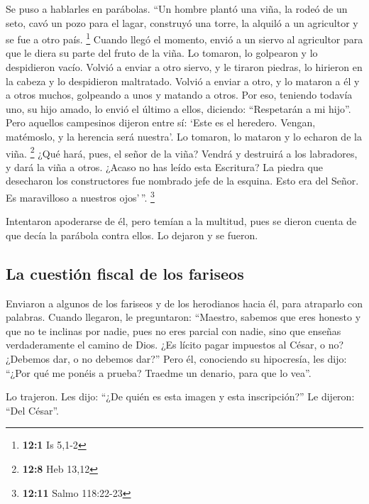  Se puso a hablarles en parábolas. ``Un hombre plantó una
viña, la rodeó de un seto, cavó un pozo para el lagar, construyó una
torre, la alquiló a un agricultor y se fue a otro país. \footnote{\textbf{12:1}
  Is 5,1-2}  Cuando llegó el momento, envió a un siervo al
agricultor para que le diera su parte del fruto de la viña.
 Lo tomaron, lo golpearon y lo despidieron vacío.
 Volvió a enviar a otro siervo, y le tiraron piedras, lo
hirieron en la cabeza y lo despidieron maltratado.  Volvió
a enviar a otro, y lo mataron a él y a otros muchos, golpeando a unos y
matando a otros.  Por eso, teniendo todavía uno, su hijo
amado, lo envió el último a ellos, diciendo: ``Respetarán a mi hijo''.
 Pero aquellos campesinos dijeron entre sí: `Este es el
heredero. Vengan, matémoslo, y la herencia será nuestra'. 
Lo tomaron, lo mataron y lo echaron de la viña. \footnote{\textbf{12:8}
  Heb 13,12}  ¿Qué hará, pues, el señor de la viña? Vendrá
y destruirá a los labradores, y dará la viña a otros. 
¿Acaso no has leído esta Escritura? La piedra que desecharon los
constructores fue nombrado jefe de la esquina.  Esto era
del Señor. Es maravilloso a nuestros ojos'\,''. \footnote{\textbf{12:11}
  Salmo 118:22-23}

 Intentaron apoderarse de él, pero temían a la multitud,
pues se dieron cuenta de que decía la parábola contra ellos. Lo dejaron
y se fueron.

\hypertarget{la-cuestiuxf3n-fiscal-de-los-fariseos}{%
\subsection{La cuestión fiscal de los
fariseos}\label{la-cuestiuxf3n-fiscal-de-los-fariseos}}

 Enviaron a algunos de los fariseos y de los herodianos
hacia él, para atraparlo con palabras.  Cuando llegaron,
le preguntaron: ``Maestro, sabemos que eres honesto y que no te inclinas
por nadie, pues no eres parcial con nadie, sino que enseñas
verdaderamente el camino de Dios. ¿Es lícito pagar impuestos al César, o
no?  ¿Debemos dar, o no debemos dar?'' Pero él,
conociendo su hipocresía, les dijo: ``¿Por qué me ponéis a prueba?
Traedme un denario, para que lo vea''.

 Lo trajeron. Les dijo: ``¿De quién es esta imagen y esta
inscripción?'' Le dijeron: ``Del César''.

